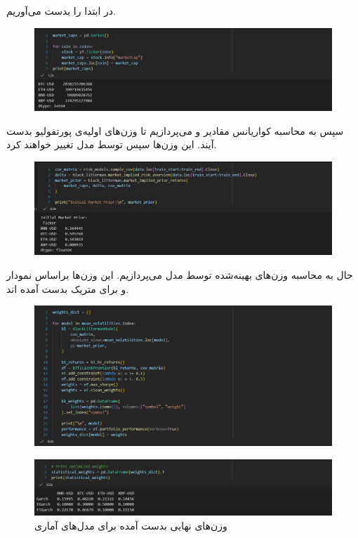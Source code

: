 \documentclass[12pt]{article}
\begin{document}
\subsubsection{}
در ابتدا  را بدست می‌آوریم.
\begin{figure}[H]
	\centering
	\includegraphics[width=0.9\linewidth]{pic_18}
\end{figure}
سپس به محاسبه کواریانس مقادیر و  می‌پردازیم تا وزن‌های اولیه‌ی پورتفولیو بدست آیند. این وزن‌ها سپس توسط مدل تغییر خواهند کرد.
\begin{figure}[H]
	\centering
	\includegraphics[width=0.9\linewidth]{pic_19}
\end{figure}
حال به محاسبه وزن‌های بهینه‌شده توسط مدل می‌پردازیم. این وزن‌ها براساس نمودار  و برای متریک  بدست آمده اند.
\begin{figure}[H]
	\centering
	\includegraphics[width=0.9\linewidth]{pic_20}
\end{figure}
\begin{figure}[H]
	\centering
	\includegraphics[width=0.9\linewidth]{pic_21}
	\caption{وزن‌های نهایی بدست آمده برای مدل‌های آماری}
\end{figure}
\end{document}
